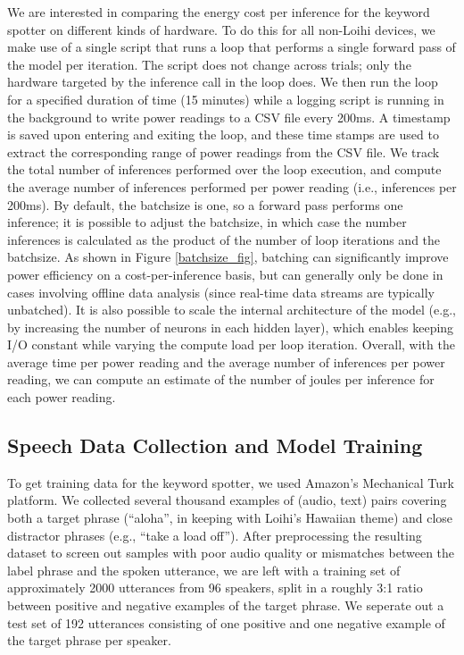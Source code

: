 \documentclass{article}
\begin{document}
We are interested in comparing the energy cost per inference for the keyword spotter on different kinds of hardware. To do this for all non-Loihi devices, we make use of a single script that runs a loop that performs a single forward pass of the model per iteration. The script does not change across trials; only the hardware targeted by the inference call in the loop does. We then run the loop for a specified duration of time (15 minutes) while a logging script is running in the background to write power readings to a CSV file every 200ms. A timestamp is saved upon entering and exiting the loop, and these time stamps are used to extract the corresponding range of power readings from the CSV file. We track the total number of inferences performed over the loop execution, and compute the average number of inferences performed per power reading (i.e., inferences per 200ms). By default, the batchsize is one, so a forward pass performs one inference; it is possible to adjust the batchsize, in which case the number inferences is calculated as the product of the number of loop iterations and the batchsize. As shown in Figure \ref{batchsize_fig}, batching can significantly improve power efficiency on a cost-per-inference basis, but can generally only be done in cases involving offline data analysis (since real-time data streams are typically unbatched). It is also possible to scale the internal architecture of the model (e.g., by increasing the number of neurons in each hidden layer), which enables keeping I/O constant while varying the compute load per loop iteration. Overall, with the average time per power reading and the average number of inferences per power reading, we can compute an estimate of the number of joules per inference for each power reading.

\subsection{Speech Data Collection and Model Training}

To get training data for the keyword spotter, we used Amazon's Mechanical Turk platform. We collected several thousand examples of (audio, text) pairs covering both a target phrase (``aloha'', in keeping with Loihi's Hawaiian theme) and close distractor phrases (e.g., ``take a load off''). After preprocessing the resulting dataset to screen out samples with poor audio quality or mismatches between the label phrase and the spoken utterance, we are left with a training set of approximately 2000 utterances from 96 speakers, split in a roughly 3:1 ratio between positive and negative examples of the target phrase. We seperate out a test set of 192 utterances consisting of one positive and one negative example of the target phrase per speaker. 
 
\end{document}
